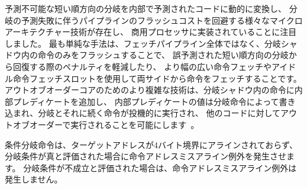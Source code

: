 \begin{commentary}
\begin{comment}
We note that various microarchitectural techniques exist to
dynamically convert unpredictable short forward branches into
internally predicated code to avoid the cost of flushing pipelines on
a branch mispredict~\cite{heil-tr1996,Klauser-1998,Kim-micro2005} and
have been implemented in commercial processors~\cite{ibmpower7}.
The simplest techniques just reduce the penalty of recovering from a
mispredicted short forward branch by only flushing instructions in the
branch shadow instead of the entire fetch pipeline, or by fetching
instructions from both sides using wide instruction fetch or idle
instruction fetch slots.  More complex techniques for out-of-order
cores add internal predicates on instructions in the branch shadow,
with the internal predicate value written by the branch instruction,
allowing the branch and following instructions to be executed
speculatively and out-of-order with respect to other code~\cite{ibmpower7}.
\end{comment}

予測不可能な短い順方向の分岐を内部で予測されたコードに動的に変換し、
分岐の予測失敗に伴うパイプラインのフラッシュコストを回避する様々なマイクロアーキテクチャー技術が存在し、
商用プロセッサに実装されていることに注目しました。
最も単純な手法は、フェッチパイプライン全体ではなく、分岐シャドウ内の命令のみをフラッシュすることで、
誤予測された短い順方向の分岐から回復する際のペナルティを軽減したり、
より幅の広い命令フェッチやアイドル命令フェッチスロットを使用して両サイドから命令をフェッチすることです。 
アウトオブオーダーコアのためのより複雑な技術は、分岐シャドウ内の命令に内部プレディケートを追加し、
内部プレディケートの値は分岐命令によって書き込まれ、分岐とそれに続く命令が投機的に実行され、
他のコードに対してアウトオブオーダーで実行されることを可能にします~\cite{ibmpower7}。
\end{commentary}

\begin{comment}
The conditional branch instructions will generate an
instruction-address-misaligned exception if the target address is not
aligned to a four-byte boundary and the branch condition evaluates
to true.  If the branch condition evaluates to false, the
instruction-address-misaligned exception will not be raised.
\end{comment}

条件分岐命令は、ターゲットアドレスが4バイト境界にアラインされておらず、
分岐条件が真と評価された場合に命令アドレスミスアライン例外を発生させます。
分岐条件が不成立と評価された場合は、命令アドレスミスアライン例外は発生しません。

